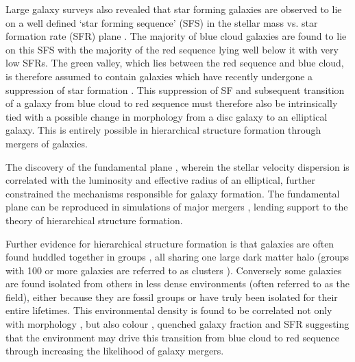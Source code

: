 Large galaxy surveys also revealed that star forming galaxies are observed to lie on a well defined `star forming sequence' (SFS) in the stellar mass vs. star formation rate (SFR) plane \citep{brinchmann04, Salim07, daddi07}. The majority of blue cloud galaxies are found to lie on this SFS with the majority of the red sequence lying well below it with very low SFRs. The green valley, which lies between the red sequence and blue cloud, is therefore assumed to contain galaxies which have recently undergone a suppression of star formation \citep[SF;][]{Salim07}. This suppression of SF and subsequent transition of a galaxy from blue cloud to red sequence must therefore also be intrinsically tied with a possible change in morphology from a disc galaxy to an elliptical galaxy. This is entirely possible in hierarchical structure formation through mergers of galaxies.

The discovery of the fundamental plane \citep{dressler87, djorgovski87}, wherein the stellar velocity dispersion is correlated with the luminosity and effective radius of an elliptical, further constrained the mechanisms responsible for galaxy formation. The fundamental plane can be reproduced in simulations of major mergers \citep{bekki98, nipoti03, boylan05, robertson06, hilz12, taranu15}, lending support to the theory of hierarchical structure formation.

Further evidence for hierarchical structure formation is that galaxies are often found huddled together in groups \citep{zwicky38, zwicky52, abell58}, all sharing one large dark matter halo (groups with 100 or more galaxies are referred to as clusters \citealt{bower04}). Conversely some galaxies are found isolated from others in less dense environments (often referred to as the field), either because they are fossil groups \citep[where all members have eventually merged][]{ponman94, jones00, jones03} or have truly been isolated for their entire lifetimes. This environmental density is found to be correlated not only with morphology \citep[][and see Figure~\ref{fig:dressler}]{dressler80, smail97, poggianti99, postman05, Bamford09}, but also colour \citep{butcher78, pimbblet02}, quenched galaxy fraction \citep{kauffmann03, Baldry06, peng12, darvish16} and SFR \citep{gomez03} suggesting that the environment may drive this transition from blue cloud to red sequence through increasing the likelihood of galaxy mergers. 

